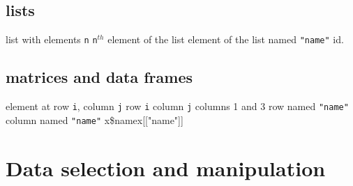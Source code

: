 \subsection{lists}{}
	{list with elements {\tt n}}
	{{\tt n}$^{th}$ element of the list}
	{element of the list named {\tt "name"}}
	{id.}

\subsection{matrices and data frames}{}
	{element at row {\tt i}, column {\tt j}}
	{row {\tt i}}
	{column {\tt j}}
	{columns 1 and 3}
	{row named {\tt "name"}}
	{column named {\tt "name"}}
	{x\$name\or x[["name"]]}

\section{Data selection and manipulation}{}
